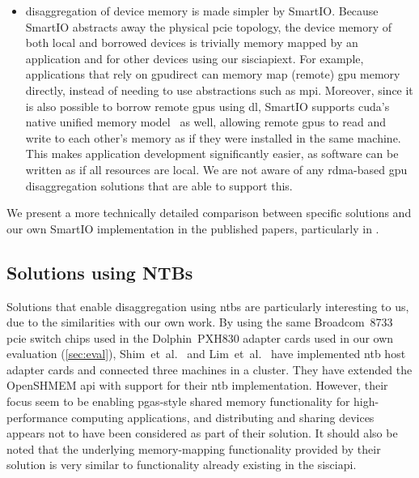 \begin{itemize}
    \item \Gls{disaggregation} of device memory is made simpler by SmartIO.
        Because SmartIO abstracts away the physical \gls{pcie} topology, the device memory of both local and borrowed devices is trivially memory mapped by an application and for other devices using our \gls{sisciapiext}.
        For example, applications that rely on \gls{gpudirect} can memory map (remote) \gls{gpu} memory directly, instead of needing to use abstractions such as \gls{mpi}.
        Moreover, since it is also possible to borrow remote \glspl{gpu} using \gls{dl}, SmartIO supports \gls{cuda}'s native unified memory model~\cite{url:unified-memory} as well, allowing remote \glspl{gpu} to read and write to each other's memory as if they were installed in the same machine.
        This makes application development significantly easier, as software can be written as if all resources are local.
        We are not aware of any \gls{rdma}-based \gls{gpu} disaggregation solutions that are able to support this.

\end{itemize}

We present a more technically detailed comparison between specific solutions and our own SmartIO implementation in the published papers, particularly in .


\subsection{Solutions using NTBs}
Solutions that enable \gls{disaggregation} using \glspl{ntb} are particularly interesting to us, due to the similarities with our own work.
%
By using the same Broadcom~8733~\cite{pex8733} \gls{pcie} switch chips used in the Dolphin~PXH830 adapter cards used in our own evaluation (\cref{sec:eval}), Shim~et~al.~\cite{Shim2018} and Lim~et~al.~\cite{Lim2019} have implemented \gls{ntb} host adapter cards and connected three machines in a cluster.
%
They have extended the OpenSHMEM \gls{api} with support for their \gls{ntb} implementation.
%
However, their focus seem to be enabling \gls{pgas}-style shared memory functionality for high-performance computing applications, and distributing and sharing devices appears not to have been considered as part of their solution.
%
It should also be noted that the underlying memory-mapping functionality provided by their solution is very similar to functionality already existing in the \gls{sisciapi}.


